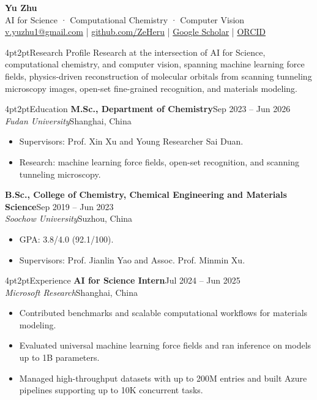 \documentclass[10pt,a4paper]{article}
\makeatletter
\renewcommand\section{\@startsection{section}{1}{0pt}%
  {4pt}{2pt}{\large\bfseries\color{accent}}}
\newcommand{\entry}[4]{%
  \textbf{#1}\hfill\textcolor{muted}{#2}\\
  \textit{#3}\hfill\textcolor{muted}{#4}\par
}
\makeatother
\begin{document}
\begin{center}
  {\LARGE\bfseries Yu Zhu}\\[3pt]
  \textcolor{muted}{AI for Science · Computational Chemistry · Computer Vision}\\[4pt]
  \href{mailto:v.yuzhu1@gmail.com}{v.yuzhu1@gmail.com}
  \quad|\quad
  \href{https://github.com/ZeHeru}{github.com/ZeHeru}
  \quad|\quad
  \href{https://scholar.google.com/citations?user=GtyV_YsAAAAJ&hl=en}{Google Scholar}
  \quad|\quad
  \href{https://orcid.org/0009-0007-1068-4548}{ORCID}
\end{center}
\small

\section{Research Profile}
Research at the intersection of AI for Science, computational chemistry, and
computer vision, spanning machine learning force fields, physics-driven
reconstruction of molecular orbitals from scanning tunneling microscopy
images, open-set fine-grained recognition, and materials modeling.

\section{Education}
\entry{M.Sc., Department of Chemistry}{Sep 2023 -- Jun 2026}
      {Fudan University}{Shanghai, China}
\begin{itemize}
  \item Supervisors: Prof. Xin Xu and Young Researcher Sai Duan.
  \item Research: machine learning force fields, open-set recognition, and scanning tunneling microscopy.
\end{itemize}

\entry{B.Sc., College of Chemistry, Chemical Engineering and Materials Science}{Sep 2019 -- Jun 2023}
      {Soochow University}{Suzhou, China}
\begin{itemize}
  \item GPA: 3.8/4.0 (92.1/100).
  \item Supervisors: Prof. Jianlin Yao and Assoc. Prof. Minmin Xu.
\end{itemize}

\section{Experience}
\entry{AI for Science Intern}{Jul 2024 -- Jun 2025}
      {Microsoft Research}{Shanghai, China}
\begin{itemize}
  \item Contributed benchmarks and scalable computational workflows for materials modeling.
  \item Evaluated universal machine learning force fields and ran inference on models up to 1B parameters.
  \item Managed high-throughput datasets with up to 200M entries and built Azure pipelines supporting up to 10K concurrent tasks.
\end{itemize}
\end{document}
